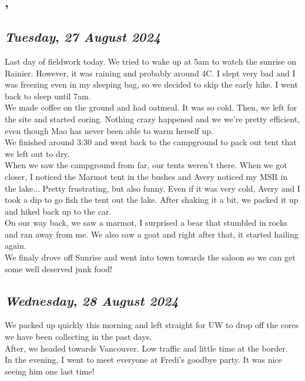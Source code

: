 \subsection*{\weekday, \day}

\def\day{\textit{27 August 2024}}
\def\weekday{\textit{Tuesday}}
\subsection*{\weekday, \day}
Last day of fieldwork today. We tried to wake up at 5am to watch the sunrise on Rainier. However, it was raining and probably around 4C. I slept very bad and I was freezing even in my sleeping bag, so we decided to skip the early hike. I went back to sleep until 7am.\\
We made coffee on the ground and had oatmeal. It was so cold. Then, we left for the site and started coring. Nothing crazy happened and we we're pretty efficient, even though Mao has never been able to warm herself up. \\ 
We finished around 3:30 and went back to the campground to pack out tent that we left out to dry. \\
When we saw the campground from far, our tents weren't there. When we got closer, I noticed the Marmot tent in the bushes and Avery noticed my MSR in the lake... Pretty frustrating, but also funny. Even if it was very cold, Avery and I took a dip to go fish the tent out the lake. After shaking it a bit, we packed it up and hiked back up to the car. \\
On our way back, we saw a marmot, I surprised a bear that stumbled in rocks and ran away from me. We also saw a goat and right after that, it started hailing again. \\
We finaly drove off Sunrise and went into town towards the saloon so we can get some well deserved junk food!

\def\day{\textit{28 August 2024}}
\def\weekday{\textit{Wednesday}}
\subsection*{\weekday, \day}
We packed up quickly this morning and left straight for UW to drop off the cores we have been collecting in the past days.\\ After, we headed towards Vancouver. Low traffic and little time at the border.\\

In the evening, I went to meet everyone at Fredi's goodbye party. It was nice seeing him one last time!

